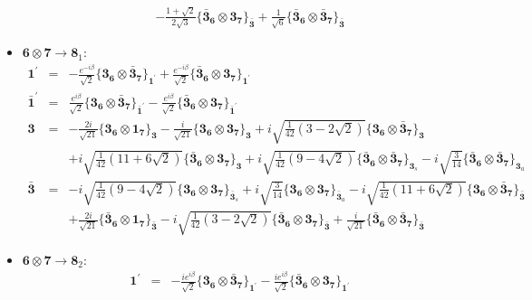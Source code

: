 \documentclass[english]{article}
\newcommand{\subcg}[3]{\big\{ {#1}\otimes{#2}\big\}^{}_{#3}}
\newcommand{\rep}[1]{\mathbf{#1}}
\begin{document}
\begin{itemize}
\begin{eqnarray*}
 & & -\frac{1+\sqrt{2}}{2 \sqrt{3}}\subcg{\rep{\bar{3}}_{\rep{6}}}{\rep{3}_{\rep{7}}}{\rep{\bar{3}}}+\frac{1}{\sqrt{6}}\subcg{\rep{\bar{3}}_{\rep{6}}}{\rep{\bar{3}}_{\rep{7}}}{\rep{\bar{3}}}
\end{eqnarray*}
\item $\rep{6}\otimes\rep{7}\to\rep{8}_{1}$:
\begin{eqnarray*}
\rep{1^{\prime}} &=& -\frac{e^{-i \beta }}{\sqrt{2}}\subcg{\rep{3}_{\rep{6}}}{\rep{\bar{3}}_{\rep{7}}}{\rep{1^{\prime}}}+\frac{e^{-i \beta }}{\sqrt{2}}\subcg{\rep{\bar{3}}_{\rep{6}}}{\rep{3}_{\rep{7}}}{\rep{1^{\prime}}}
\\
\rep{\bar{1}^{\prime}} &=& \frac{e^{i \beta }}{\sqrt{2}}\subcg{\rep{3}_{\rep{6}}}{\rep{\bar{3}}_{\rep{7}}}{\rep{\bar{1}^{\prime}}}-\frac{e^{i \beta }}{\sqrt{2}}\subcg{\rep{\bar{3}}_{\rep{6}}}{\rep{3}_{\rep{7}}}{\rep{\bar{1}^{\prime}}}
\\
\rep{3} &=& -\frac{2 i}{\sqrt{21}}\subcg{\rep{3}_{\rep{6}}}{\rep{1}_{\rep{7}}}{\rep{3}}-\frac{i}{\sqrt{21}}\subcg{\rep{3}_{\rep{6}}}{\rep{3}_{\rep{7}}}{\rep{3}}+i \sqrt{\frac{1}{42} \left(3-2 \sqrt{2}\right)}\subcg{\rep{3}_{\rep{6}}}{\rep{\bar{3}}_{\rep{7}}}{\rep{3}} \\ 
 & & +i \sqrt{\frac{1}{42} \left(11+6 \sqrt{2}\right)}\subcg{\rep{\bar{3}}_{\rep{6}}}{\rep{3}_{\rep{7}}}{\rep{3}}+i \sqrt{\frac{1}{42} \left(9-4 \sqrt{2}\right)}\subcg{\rep{\bar{3}}_{\rep{6}}}{\rep{\bar{3}}_{\rep{7}}}{\rep{3}_{s}}-i \sqrt{\frac{3}{14}}\subcg{\rep{\bar{3}}_{\rep{6}}}{\rep{\bar{3}}_{\rep{7}}}{\rep{3}_{a}}
\\
\rep{\bar{3}} &=& -i \sqrt{\frac{1}{42} \left(9-4 \sqrt{2}\right)}\subcg{\rep{3}_{\rep{6}}}{\rep{3}_{\rep{7}}}{\rep{\bar{3}}_{s}}+i \sqrt{\frac{3}{14}}\subcg{\rep{3}_{\rep{6}}}{\rep{3}_{\rep{7}}}{\rep{\bar{3}}_{a}}-i \sqrt{\frac{1}{42} \left(11+6 \sqrt{2}\right)}\subcg{\rep{3}_{\rep{6}}}{\rep{\bar{3}}_{\rep{7}}}{\rep{\bar{3}}} \\ 
 & & +\frac{2 i}{\sqrt{21}}\subcg{\rep{\bar{3}}_{\rep{6}}}{\rep{1}_{\rep{7}}}{\rep{\bar{3}}}-i \sqrt{\frac{1}{42} \left(3-2 \sqrt{2}\right)}\subcg{\rep{\bar{3}}_{\rep{6}}}{\rep{3}_{\rep{7}}}{\rep{\bar{3}}}+\frac{i}{\sqrt{21}}\subcg{\rep{\bar{3}}_{\rep{6}}}{\rep{\bar{3}}_{\rep{7}}}{\rep{\bar{3}}}
\end{eqnarray*}
\item $\rep{6}\otimes\rep{7}\to\rep{8}_{2}$:
\begin{eqnarray*}
\rep{1^{\prime}} &=& -\frac{i e^{i \beta }}{\sqrt{2}}\subcg{\rep{3}_{\rep{6}}}{\rep{\bar{3}}_{\rep{7}}}{\rep{1^{\prime}}}-\frac{i e^{i \beta }}{\sqrt{2}}\subcg{\rep{\bar{3}}_{\rep{6}}}{\rep{3}_{\rep{7}}}{\rep{1^{\prime}}}

\end{eqnarray*}
\end{itemize}
\end{document}
